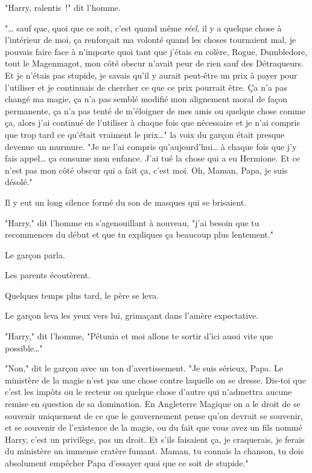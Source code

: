 "Harry, ralentis~!" dit l'homme.

"… sauf que, quoi que ce soit, c'est quand même \emph{réel}, il y a quelque chose à l'intérieur de moi, ça renforçait ma volonté quand les choses tournaient mal, je pouvais faire face à n'importe quoi tant que j'étais en colère, Rogue, Dumbledore, tout le Magenmagot, mon côté obscur n'avait peur de rien sauf des Détraqueurs. Et je n'étais pas stupide, je savais qu'il y aurait peut-être un prix à payer pour l'utiliser et je continuais de chercher ce que ce prix pourrait être. Ça n'a pas changé ma magie, ça n'a pas semblé modifié mon alignement moral de façon permanente, ça n'a pas tenté de m'éloigner de mes amis ou quelque chose comme ça, alors j'ai continué de l'utiliser à chaque fois que nécessaire et je n'ai compris que trop tard ce qu'était vraiment le prix…" la voix du garçon était presque devenue un murmure. "Je ne l'ai compris qu'aujourd'hui… à chaque fois que j'y fais appel… ça consume mon enfance. J'ai tué la chose qui a eu Hermione. Et ce n'est pas mon côté obscur qui a fait ça, c'est moi. Oh, Maman, Papa, je suis désolé."

Il y eut un long silence formé du son de masques qui se brisaient.

"Harry," dit l'homme en s'agenouillant à nouveau, "j'ai besoin que tu recommences du début et que tu expliques ça beaucoup plus lentement."

Le garçon parla.

Les parents écoutèrent.

Quelques temps plus tard, le père se leva.

Le garçon leva les yeux vers lui, grimaçant dans l'amère expectative.

"Harry," dit l'homme, "Pétunia et moi allons te sortir d'ici aussi vite que possible…"

"Non," dit le garçon avec un ton d'avertissement. "Je suis sérieux, Papa. Le ministère de la magie n'est pas une chose contre laquelle on se dresse. Dis-toi que c'est les impôts ou le recteur ou quelque chose d'autre qui n'admettra aucune remise en question de sa domination. En Angleterre Magique on a le droit de se souvenir uniquement de ce que le gouvernement pense qu'on devrait se souvenir, et se souvenir de l'existence de la magie, ou du fait que vous avez un fils nommé Harry, c'est un privilège, pas un droit. Et s'ils faisaient ça, je craquerais, je ferais du ministère un immense cratère fumant. Maman, tu connais la chanson, tu dois absolument empêcher Papa d'essayer quoi que ce soit de stupide."

